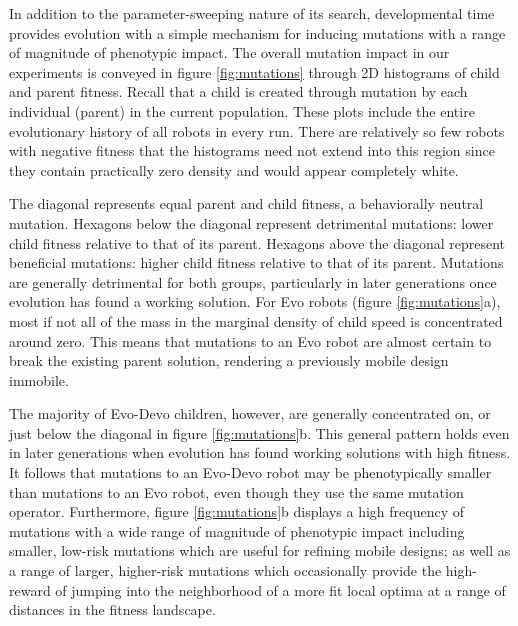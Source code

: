 In addition to the parameter-sweeping nature of its search,
developmental time provides evolution with a 
simple mechanism for inducing mutations with a range of magnitude
of phenotypic impact.
The overall mutation impact in our experiments is conveyed in figure \ref{fig:mutations} through 2D histograms of child and parent fitness. Recall that a child is created through mutation by each individual (parent) in the current population. These plots include the entire evolutionary history of all robots in every run. There are relatively so few robots with negative fitness that the histograms need not extend into this region since they contain practically zero density and would appear completely white.

The diagonal represents equal parent and child fitness, a behaviorally neutral mutation. Hexagons below the diagonal represent detrimental mutations: lower child fitness relative to that of its parent. Hexagons above the diagonal represent beneficial mutations: higher child fitness relative to that of its parent.
Mutations are generally detrimental for both groups, particularly in later generations once evolution has found a working solution.
For Evo robots (figure \ref{fig:mutations}a),
most if not all of the mass in the marginal density of child speed is concentrated around zero.
This means that mutations to an Evo robot are almost certain to break the existing parent solution, rendering a previously mobile design immobile.

The majority of Evo-Devo children, however, are generally concentrated on, or just below the diagonal in figure \ref{fig:mutations}b. 
This general pattern holds even in later generations when evolution has found working solutions with high fitness.
It follows that mutations to an Evo-Devo robot may be phenotypically smaller than mutations to an Evo robot, even though they use the same mutation operator. 
Furthermore, figure \ref{fig:mutations}b displays a high frequency of mutations with a wide range of magnitude of phenotypic impact including smaller, low-risk mutations which are useful for refining mobile designs; as well as a range of larger, higher-risk mutations which occasionally provide the high-reward of jumping into the neighborhood of a more fit local optima at a range of distances in the fitness landscape.


